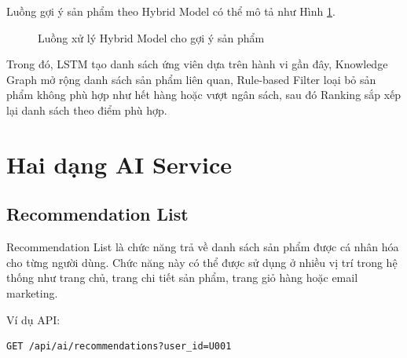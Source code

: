\documentclass[../main.tex]{subfiles}
\begin{document}
Luồng gợi ý sản phẩm theo Hybrid Model có thể mô tả như Hình \ref{fig:chapter3-hybrid-flow}.

\begin{figure}[H]
    \centering
    \caption{Luồng xử lý Hybrid Model cho gợi ý sản phẩm}
    \label{fig:chapter3-hybrid-flow}
\end{figure}

Trong đó, LSTM tạo danh sách ứng viên dựa trên hành vi gần đây, Knowledge Graph mở rộng danh sách sản phẩm liên quan, Rule-based Filter loại bỏ sản phẩm không phù hợp như hết hàng hoặc vượt ngân sách, sau đó Ranking sắp xếp lại danh sách theo điểm phù hợp.

\section{Hai dạng AI Service}

\subsection{Recommendation List}

Recommendation List là chức năng trả về danh sách sản phẩm được cá nhân hóa cho từng người dùng. Chức năng này có thể được sử dụng ở nhiều vị trí trong hệ thống như trang chủ, trang chi tiết sản phẩm, trang giỏ hàng hoặc email marketing.

Ví dụ API:

\begin{verbatim}
GET /api/ai/recommendations?user_id=U001
\end{verbatim}
\end{document}
